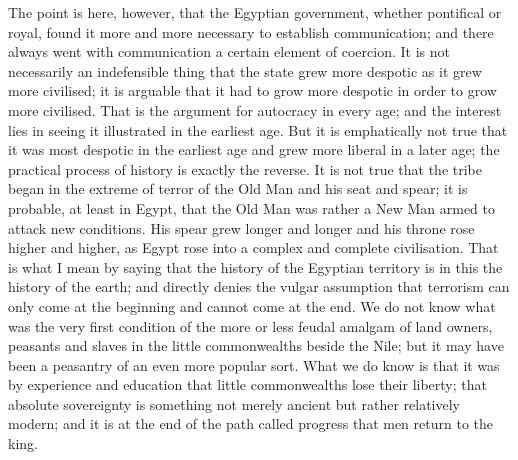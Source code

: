 The point is here, however, that the Egyptian government, whether pontifical or royal, found it more and more necessary to establish communication; and there always went with communication a certain element of coercion. It is not necessarily an indefensible thing that the state grew more despotic as it grew more civilised; it is arguable that it had to grow more despotic in order to grow more civilised. That is the argument for autocracy in every age; and the interest lies in seeing it illustrated in the earliest age. But it is emphatically not true that it was most despotic in the earliest age and grew more liberal in a later age; the practical process of history is exactly the reverse. It is not true that the tribe began in the extreme of terror of the Old Man and his seat and spear; it is probable, at least in Egypt, that the Old Man was rather a New Man armed to attack new conditions. His spear grew longer and longer and his throne rose higher and higher, as Egypt rose into a complex and complete civilisation. That is what I mean by saying that the history of the Egyptian territory is in this the history of the earth; and directly denies the vulgar assumption that terrorism can only come at the beginning and cannot come at the end. We do not know what was the very first condition of the more or less feudal amalgam of land owners, peasants and slaves in the little commonwealths beside the Nile; but it may have been a peasantry of an even more popular sort. What we do know is that it was by experience and education that little commonwealths lose their liberty; that absolute sovereignty is something not merely ancient but rather relatively modern; and it is at the end of the path called progress that men return to the king.

